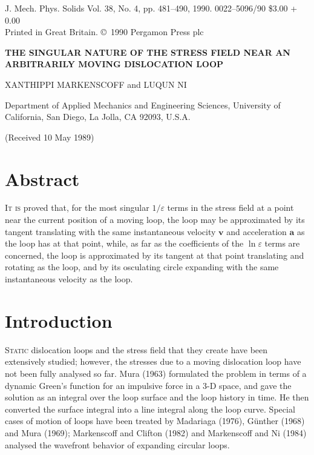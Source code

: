 \documentclass[12pt]{article}
\begin{document}
\noindent J. Mech. Phys. Solids Vol. 38, No. 4, pp. 481--490, 1990. \hfill 0022--5096/90 \$3.00 + 0.00 \\
Printed in Great Britain. \hfill \copyright\ 1990 Pergamon Press plc

\vspace{1cm}

\begin{center}
{\Large\bf THE SINGULAR NATURE OF THE STRESS FIELD NEAR AN ARBITRARILY MOVING DISLOCATION LOOP}

\vspace{0.5cm}

{\large XANTHIPPI MARKENSCOFF and LUQUN NI\textdagger}

\vspace{0.3cm}

Department of Applied Mechanics and Engineering Sciences, University of California, San Diego, La Jolla, CA 92093, U.S.A.

\vspace{0.3cm}

(Received 10 May 1989)
\end{center}

\section*{Abstract}

\textsc{It is} proved that, for the most singular $1/\varepsilon$ terms in the stress field at a point near the current position of a moving loop, the loop may be approximated by its tangent translating with the same instantaneous velocity $\mathbf{v}$ and acceleration $\mathbf{a}$ as the loop has at that point, while, as far as the coefficients of the $\ln\varepsilon$ terms are concerned, the loop is approximated by its tangent at that point translating and rotating as the loop, and by its osculating circle expanding with the same instantaneous velocity as the loop.

\section{Introduction}

\textsc{Static} dislocation loops and the stress field that they create have been extensively studied; however, the stresses due to a moving dislocation loop have not been fully analysed so far. Mura (1963) formulated the problem in terms of a dynamic Green's function for an impulsive force in a 3-D space, and gave the solution as an integral over the loop surface and the loop history in time. He then converted the surface integral into a line integral along the loop curve. Special cases of motion of loops have been treated by Madariaga (1976), G\"unther (1968) and Mura (1969); Markenscoff and Clifton (1982) and Markenscoff and Ni (1984) analysed the wavefront behavior of expanding circular loops.
\end{document}
